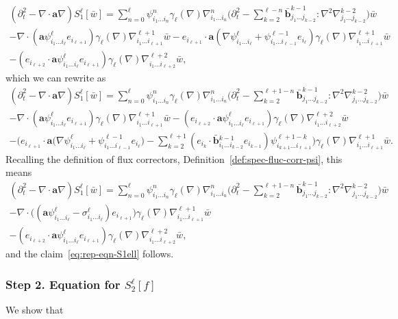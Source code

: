 \documentclass[JEP,XML,SOM,Unicode,published]{cedram}
\theoremstyle{plain}
\theoremstyle{definition}
\numberwithin{equation}{section}
\newcommand{\ee}{e}
\newcommand{\Aa}{\boldsymbol a}
\newcommand{\bb}{{\boldsymbol b}}
\newcommand{\step}[1]{\subsubsection*{Step \textup #1}}
\begin{document}
{\begin{multline*}
(\partial_t^2-\nabla \cdot \Aa \nabla) S_1^\ell[\bar w]=
\sum_{n=0}^{\ell} \psi^n_{i_1\ldots i_n} \gamma_\ell(\nabla)\nabla^n_{i_1\ldots i_n} \Big(\partial_t^2-\sum_{k=2}^{\ell-n} \bar \bb^{k-1}_{j_1\ldots j_{k-2}}:\nabla^2\nabla^{k-2}_{j_1\ldots j_{k-2}}\Big) \bar w
\\
- \nabla \cdot (\Aa \psi^\ell_{i_1\ldots i_\ell}\ee_{i_{\ell+1}}) \gamma_\ell(\nabla) \nabla^{\ell+1}_{i_1\ldots i_{\ell+1}}\bar w
- \ee_{i_{\ell+1}}\cdot\Aa(\nabla \psi^\ell_{i_1\ldots i_\ell}+\psi^{\ell-1}_{i_1\ldots i_{\ell-1}} e_{i_\ell})\gamma_\ell(\nabla) \nabla^{\ell+1}_{i_1\ldots i_{\ell+1}} \bar w\\
-(\ee_{i_{\ell+2}}\cdot\Aa \psi^\ell_{i_1\ldots i_{\ell}} e_{i_{\ell+1}}) \gamma_\ell(\nabla) \nabla^{\ell+2}_{i_1\ldots i_{\ell+2}} \bar w,
\end{multline*}
which we can rewrite as\vspace*{-3pt}
\begin{multline*}
(\partial_t^2-\nabla \cdot \Aa \nabla) S_1^\ell[\bar w]=
\sum_{n=0}^{\ell} \psi^n_{i_1\ldots i_n} \gamma_\ell(\nabla)\nabla^n_{i_1\ldots i_n} \Big(\partial_t^2-\sum_{k=2}^{\ell+1-n}\bar \bb^{k-1}_{j_1\ldots j_{k-2}}:\nabla^2\nabla^{k-2}_{j_1\ldots j_{k-2}}\Big) \bar w
\\
- \nabla \cdot (\Aa \psi^\ell_{i_1\ldots i_\ell}\ee_{i_{\ell+1}}) \gamma_\ell(\nabla) \nabla^{\ell+1}_{i_1\ldots i_{\ell+1}}\bar w -(\ee_{i_{\ell+2}}\cdot\Aa \psi^\ell_{i_1\ldots i_{\ell}} e_{i_{\ell+1}}) \gamma_\ell(\nabla) \nabla^{\ell+2}_{i_1\ldots i_{\ell+2}} \bar w\\
- \Big(\ee_{i_{\ell+1}}\cdot\Aa(\nabla \psi^\ell_{i_1\ldots i_\ell}+\psi^{\ell-1}_{i_1\ldots i_{\ell-1}} e_{i_\ell}\big)-\sum_{k=2}^{\ell+1}(\ee_{i_{k}}\cdot\bar\bb{}^{k-1}_{i_1\ldots i_{k-2}}\ee_{i_{k-1}})\psi^{\ell+1-k}_{i_{k+1}\ldots i_{\ell+1}} \Big) \gamma_\ell(\nabla)\nabla^{\ell+1}_{i_1\ldots i_{\ell+1}} \bar w.
\end{multline*}
Recalling the definition of flux correctors, \cf Definition~\ref{def:spec-fluc-corr-psi}, this means\vspace*{-3pt}\enlargethispage{\baselineskip}
\begin{multline*}
(\partial_t^2-\nabla \cdot \Aa \nabla) S_1^\ell[\bar w]=
\sum_{n=0}^\ell \psi^n_{i_1\ldots i_n} \gamma_\ell(\nabla)\nabla^n_{i_1\ldots i_n}\Big(\partial_t^2-\sum_{k=2}^{\ell+1-n} \bar \bb^{k-1}_{j_1\ldots j_{k-2}}:\nabla^2\nabla^{k-2}_{j_1\ldots j_{k-2}}\Big) \bar w\\
- \nabla \cdot \big((\Aa \psi^\ell_{i_1\ldots i_\ell}-\sigma^\ell_{i_1\ldots i_\ell})\ee_{i_{\ell+1}}\big) \gamma_\ell(\nabla) \nabla^{\ell+1}_{i_1\ldots i_{\ell+1}}\bar w
\\
-(\ee_{i_{\ell+2}}\cdot\Aa \psi^\ell_{i_1\ldots i_{\ell}} e_{i_{\ell+1}}) \gamma_\ell(\nabla) \nabla^{\ell+2}_{i_1\ldots i_{\ell+2}} \bar w,
\end{multline*}
and the claim~\eqref{eq:rep-eqn-S1ell} follows.

\step{2. Equation for $S_2^{\ell}[f]$}
We show that}\vspace*{-7pt}
\end{document}
